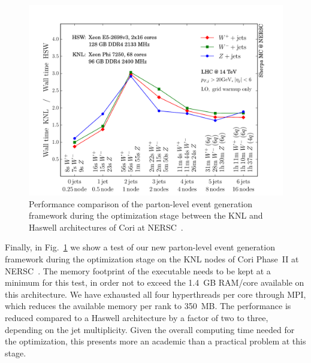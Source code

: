 \documentclass[aps,prd,twocolumn,fleqn,superscriptaddress,groupedaddress,nofootinbib,preprintnumbers]{revtex4}
\begin{document}
\begin{figure}[t]
    \centering
    \includegraphics[width=\linewidth]{fig/knl-vs-hsw.pdf}
    \caption{Performance comparison of the parton-level event generation
      framework during the optimization stage between the KNL and Haswell
      architectures of Cori at NERSC~\cite{cori}.}
    \label{fig:knl_vs_hsw}
\end{figure}
Finally, in Fig.~\ref{fig:knl_vs_hsw} we show a test of our new parton-level
event generation framework during the optimization stage on the KNL nodes
of Cori Phase~II at NERSC~\cite{cori}.
The memory footprint of the executable needs to be kept at a minimum for this test,
in order not to exceed the 1.4~GB RAM/core available on this architecture. We have
exhausted all four hyperthreads per core through MPI, which reduces the available
memory per rank to 350~MB. The performance is reduced compared to a Haswell
architecture by a factor of two to three, depending on the jet multiplicity.
Given the overall computing time needed for the optimization, this presents
more an academic than a practical problem at this stage.
\end{document}
